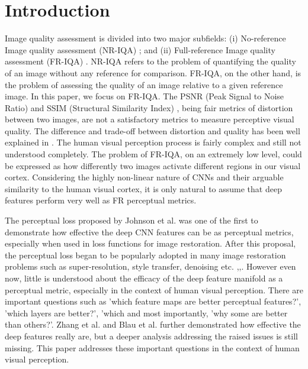 \documentclass[10pt,twocolumn,letterpaper]{article}
\begin{document}
\section{Introduction}
    Image quality assessment is divided into two major subfields: (i) No-reference Image quality assessment (NR-IQA) \cite{3}; and (ii) Full-reference Image quality assessment (FR-IQA) \cite{4}. NR-IQA refers to the problem of quantifying the quality of an image without any reference for comparison. FR-IQA, on the other hand, is the problem of assessing the quality of an image relative to a given reference image. In this paper, we focus on FR-IQA. The PSNR (Peak Signal to Noise Ratio) and SSIM (Structural Similarity Index) \cite{6}, being fair metrics of distortion between two images, are not a satisfactory metrics to measure perceptive visual quality. The difference and trade-off between distortion and quality has been well explained in \cite{5}. The human visual perception process is fairly complex and still not understood completely. The problem of FR-IQA, on an extremely low level, could be expressed as how differently two images activate different regions in our visual cortex. Considering the highly non-linear nature of CNNs and their arguable similarity to the human visual cortex, it is only natural to assume that deep features perform very well as FR perceptual metrics.

    The perceptual loss proposed by Johnson et al. \cite{7} was one of the first to demonstrate how effective the deep CNN features can be as perceptual metrics, especially when used in loss functions for image restoration. After this proposal, the perceptual loss began to be popularly adopted in many image restoration problems such as super-resolution, style transfer, denoising etc. \cite{9},\cite{10},\cite{11}. However even now, little is understood about the efficacy of the deep feature manifold as a perceptual metric, especially in the context of human visual perception. There are important questions such as 'which feature maps are better perceptual features?', 'which layers are better?', 'which and most importantly, 'why some are better than others?'. Zhang et al. \cite{12} and Blau et al. \cite{5} further demonstrated how effective the deep features really are, but a deeper analysis addressing the raised issues is still missing. This paper addresses these important questions in the context of human visual perception.
\end{document}
